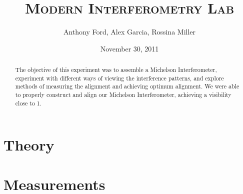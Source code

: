 \documentclass[12pt,titlepage,final]{article}
\begin{document}
\graphicspath{{./images/}}
\title{\textsc{Modern Interferometry Lab}}
\author{Anthony Ford, Alex Garcia, Rossina Miller}
\date{November 30, 2011}
\maketitle

\clearpage

\begin{abstract}
The objective of this experiment was to assemble a Michelson Interferometer,
experiment with different ways of viewing the interference patterns, and explore
methods of measuring the alignment and achieving optimum alignment. We were able
to properly construct and align our Michelson Interferometer, achieving a
visibility close to 1.
\end{abstract}



\section{Theory}






\section{Measurements}
\end{document}
